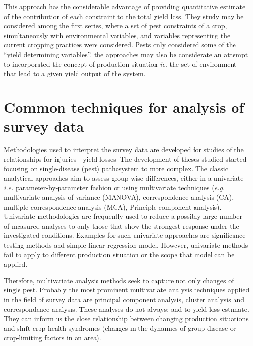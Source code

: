 \documentclass[12pt, oneside]{report}
\begin{document}
This approach has the considerable advantage of providing quantitative estimate of the contribution of each constraint to the total yield loss. They study may be considered among the first series, where a set of pest constraints of a crop, simultaneously with environmental variables, and variables representing the current cropping practices were considered. Pests only considered some of the ``yield determining variables''. the approaches may also be considerate an attempt to incorporated the concept of production situation \textit{ie}. the set of environment that lead to a given yield output of the system. 

\section*{Common techniques for analysis of survey data}

Methodologies used to interpret the survey data are developed for studies of the relationships for injuries - yield losses. The development of theses studied started focusing on single-disease (pest) pathosystem to more complex. The classic analytical approaches aim to assess group-wise differences, either in a univariate \textit{i.e.} parameter-by-parameter fashion or using multivariate techniques (\textit{e.g.} multivariate analysis of variance (MANOVA), correspondence analysis (CA), multiple correspondence analysis (MCA), Principle component analysis). Univariate methodologies are frequently used to reduce a possibly large number of measured analyses to only those that show the strongest response under the investigated conditions. Examples for such univariate approaches are significance testing methods and simple linear regression model. However, univariate methods fail to apply to different production situation or the scope that model can be applied.


Therefore, multivariate analysis methods seek to capture not only changes of single pest. Probably the most prominent multivariate analysis techniques applied in the field of survey data are principal component analysis, cluster analysis and correspondence analysis. These analyses do not always; and to yield loss estimate. They can inform us the close relationship between changing production situations and shift crop health syndromes (changes in the dynamics of group disease or crop-limiting factors in an area). 
\end{document}
